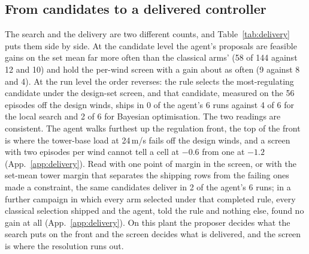 \documentclass{article}
\begin{document}
\subsection{From candidates to a delivered controller}
\label{sec:delivery}
The search and the delivery are two different counts, and Table~\ref{tab:delivery} puts them side by side. At the candidate level the agent's proposals are feasible gains on the set mean far more often than the classical arms' (58 of 144 against 12 and 10) and hold the per-wind screen with a gain about as often (9 against 8 and 4). At the run level the order reverses: the rule selects the most-regulating candidate under the design-set screen, and that candidate, measured on the 56 episodes off the design winds, ships in 0 of the agent's 6 runs against 4 of 6 for the local search and 2 of 6 for Bayesian optimisation. The two readings are consistent. The agent walks furthest up the regulation front, the top of the front is where the tower-base load at 24\,m/s fails off the design winds, and a screen with two episodes per wind cannot tell a cell at $-0.6$ from one at $-1.2$ (App.~\ref{app:delivery}). Read with one point of margin in the screen, or with the set-mean tower margin that separates the shipping rows from the failing ones made a constraint, the same candidates deliver in 2 of the agent's 6 runs; in a further campaign in which every arm selected under that completed rule, every classical selection shipped and the agent, told the rule and nothing else, found no gain at all (App.~\ref{app:delivery}). On this plant the proposer decides what the search puts on the front and the screen decides what is delivered, and the screen is where the resolution runs out.
\end{document}
